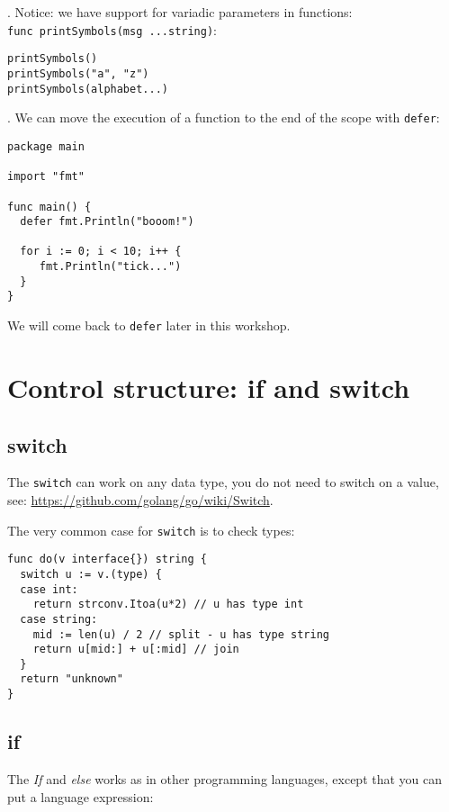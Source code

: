 \documentclass[11pt, letterpaper]{article}
\begin{document}
. Notice: we have support for variadic parameters in functions:\\ \texttt{func printSymbols(msg ...string)}:

\begin{verbatim}
printSymbols()
printSymbols("a", "z")
printSymbols(alphabet...)
\end{verbatim}

. We can move the execution of a function to the end of the scope with \texttt{defer}:

\begin{verbatim}
package main

import "fmt"

func main() {
  defer fmt.Println("booom!")

  for i := 0; i < 10; i++ {
     fmt.Println("tick...")
  }
}
\end{verbatim}

We will come back to \texttt{defer} later in this workshop.

\section{Control structure: if and switch}

\subsection{switch}

The \texttt{switch} can work on any data type, you do not need to switch on a value, see: \href{Golang Wiki}{https://github.com/golang/go/wiki/Switch}.

The very common case for \texttt{switch} is to check types:

\begin{verbatim}
func do(v interface{}) string {
  switch u := v.(type) {
  case int:
    return strconv.Itoa(u*2) // u has type int
  case string:
    mid := len(u) / 2 // split - u has type string
    return u[mid:] + u[:mid] // join
  }
  return "unknown"
}
\end{verbatim}

\subsection{if}

The \emph{If} and \emph{else} works as in other programming languages, except that you can put a language expression:
\end{document}
